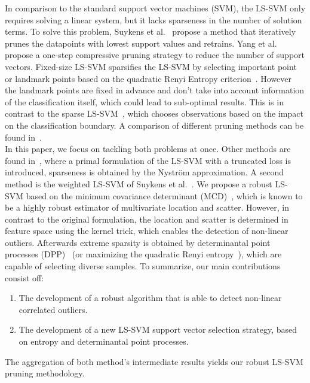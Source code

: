 \documentclass[preprint,12pt]{elsarticle}
\begin{document}
	In comparison to the standard support vector machines (SVM), the LS-SVM only requires solving a linear system, but it lacks sparseness in the number of solution terms. To solve this problem, Suykens et al.~\cite{suykens2000sparse} propose a method that iteratively prunes the datapoints with lowest support values and retrains. Yang et al.~\cite{yang2014sparse} propose a one-step compressive pruning strategy to reduce the number of support vectors. Fixed-size LS-SVM sparsifies the LS-SVM by selecting important point or landmark points based on the quadratic Renyi Entropy criterion~\cite{suykens2002least}. However the landmark points are fixed in advance and don't take into account information of the classification itself, which could lead to sub-optimal results. This is in contrast to the sparse LS-SVM~\cite{suykens2000sparse}, which chooses observations based on the impact on the classification boundary. A comparison of different pruning methods can be found in~\cite{hoegaerts2004comparison}. \\
	
	In this paper, we focus on tackling both problems at once.
	Other methods are found in~\cite{chen2018sparse}, where a primal formulation of the LS-SVM with a truncated loss is introduced, sparseness is obtained by the Nystr\"{o}m approximation. A second method is the weighted LS-SVM of Suykens et al.~\cite{suykens2002weighted}. We propose a robust LS-SVM based on the minimum covariance determinant (MCD)~\cite{hubert2010minimum}, which is known to be a highly robust 	estimator of multivariate location and scatter. However, in contrast to the original formulation, the location and scatter is determined in feature space using the kernel trick, which enables the detection of non-linear outliers. Afterwards extreme sparsity is obtained by determinantal point processes (DPP)~\cite{kulesza2012determinantal} (or maximizing the quadratic Renyi entropy~\cite{suykens2002least}), which are capable of selecting diverse samples. To summarize, our main contributions consist off:
	\begin{enumerate}
		\item The development of a robust algorithm that is able to detect non-linear correlated outliers.
		\item The development of a new LS-SVM support vector selection strategy, based on entropy and determinantal point processes.
	\end{enumerate}
	The aggregation of both method's intermediate results yields our robust LS-SVM pruning methodology. \\ 
	
\end{document}
